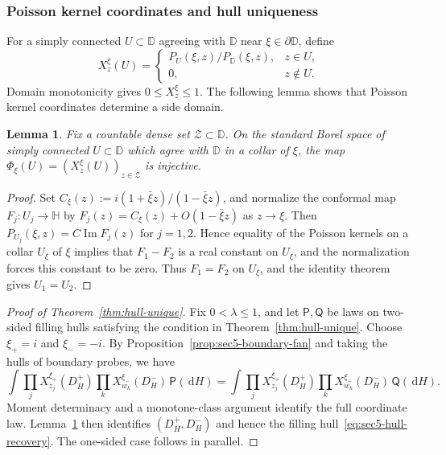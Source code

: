 \documentclass[11pt]{article}
\numberwithin{equation}{section}
\newcommand{\D}{\mathbb{D}}
\newcommand{\1}{\mathbf{1}}
\newtheorem{lemma}[theorem]{Lemma}
\newcommand{\dd}{\,\mathrm d}
\begin{document}
\subsubsection{Poisson kernel coordinates and hull uniqueness}
\label{subsec:sec5-hull-moments}

For a simply connected \(U\subset\D\) agreeing with \(\D\) near
\(\xi\in\partial\D\), define
\begin{equation}
 X_z^\xi(U)=
 \begin{cases}
 P_U(\xi,z)/P_\D(\xi,z),&z\in U,\\
 0,&z\notin U.
 \end{cases}
\end{equation}
Domain monotonicity gives \(0\leq X_z^\xi\leq1\). The following lemma shows that Poisson kernel coordinates determine a side domain.

\begin{lemma}
\label{lem:sec5-poisson-injective}
Fix a countable dense set \(\mathcal Z\subset\D\).  On the standard Borel
space of simply connected \(U\subset\D\) which agree with \(\D\) in a
collar of \(\xi\), the map $\Phi_\xi(U)=(X_z^\xi(U))_{z\in\mathcal Z}$ is injective.
\end{lemma}

\begin{proof}
Set \(C_\xi(z):=i(1+\bar\xi z)/(1-\bar\xi z)\), and normalize the conformal map \(F_j:U_j\to\mathbb H\) by \(F_j(z)=C_\xi(z)+O(1-\bar\xi z)\) as \(z\to\xi\). Then \(P_{U_j}(\xi,z)=C\operatorname{Im}F_j(z)\) for \(j=1,2\). Hence equality of the Poisson kernels on a collar $U_\xi$ of $\xi$ implies that \(F_1-F_2\) is a real constant on $U_\xi$, and the normalization forces this constant to be zero. Thus \(F_1=F_2\) on $U_\xi$, and the identity theorem gives \(U_1=U_2\).
\end{proof}

\begin{proof}[Proof of Theorem~\ref{thm:hull-unique}]
Fix \(0<\lambda\leq1\), and let \(\mathsf P,\mathsf Q\) be laws on
two-sided filling hulls satisfying the condition in Theorem~\ref{thm:hull-unique}.  
Choose \(\xi_+=i\) and \(\xi_-=-i\).
By Proposition~\ref{prop:sec5-boundary-fan} and taking the hulls of boundary probes, we have
\begin{equation}
 \int
 \prod_jX_{z_j}^{\xi_+}(D_H^+)
 \prod_kX_{w_k}^{\xi_-}(D_H^-)\,\mathsf P(\dd H)
 =
 \int
 \prod_jX_{z_j}^{\xi_+}(D_H^+)
 \prod_kX_{w_k}^{\xi_-}(D_H^-)\,\mathsf Q(\dd H).
\end{equation}
Moment determinacy and a monotone-class argument identify
the full coordinate law.
Lemma~\ref{lem:sec5-poisson-injective} then identifies \((D_H^+,D_H^-)\) and hence the filling hull~\eqref{eq:sec5-hull-recovery}.
The one-sided case follows in parallel.
\end{proof}
\end{document}
